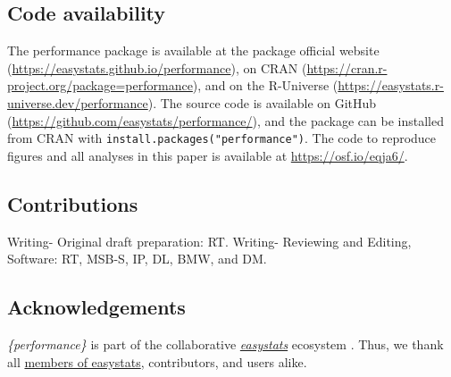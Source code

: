\documentclass[sn-basic, lineno,pdflatex]{sn-jnl}
\begin{document}
\subsection{Code availability}\label{code-availability}

The performance package is available at the package official website
(\url{https://easystats.github.io/performance}), on CRAN
(\url{https://cran.r-project.org/package=performance}), and on the
R-Universe (\url{https://easystats.r-universe.dev/performance}). The
source code is available on GitHub
(\url{https://github.com/easystats/performance/}), and the package can
be installed from CRAN with \texttt{install.packages("performance")}.
The code to reproduce figures and all analyses in this paper is
available at \url{https://osf.io/eqja6/}.

\subsection{Contributions}\label{contributions}

Writing- Original draft preparation: RT. Writing- Reviewing and Editing,
Software: RT, MSB-S, IP, DL, BMW, and DM.

\subsection{Acknowledgements}\label{acknowledgements}

\emph{\{performance\}} is part of the collaborative
\href{https://github.com/easystats/easystats}{\emph{easystats}}
ecosystem \citep{easystatspackage}. Thus, we thank all
\href{https://github.com/orgs/easystats/people}{members of easystats},
contributors, and users alike.

\renewcommand\refname{References}

\end{document}
